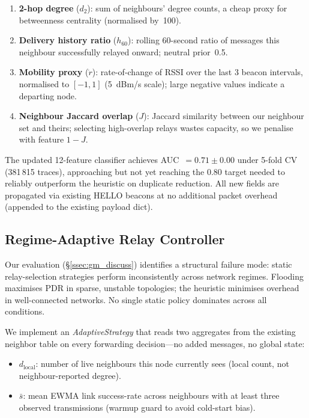 \documentclass[conference]{IEEEtran}
\begin{document}
\begin{enumerate}
  \item \textbf{2-hop degree} ($d_{2}$): sum of neighbours' degree counts, a
        cheap proxy for betweenness centrality (normalised by~100).
  \item \textbf{Delivery history ratio} ($h_{60}$): rolling 60-second ratio of
        messages this neighbour successfully relayed onward; neutral prior~0.5.
  \item \textbf{Mobility proxy} ($\dot{r}$): rate-of-change of RSSI over the
        last 3 beacon intervals, normalised to $[-1,1]$ (5~dBm/s scale);
        large negative values indicate a departing node.
  \item \textbf{Neighbour Jaccard overlap} ($J$): Jaccard similarity between
        our neighbour set and theirs; selecting high-overlap relays wastes
        capacity, so we penalise with feature $1-J$.
\end{enumerate}

The updated 12-feature classifier achieves AUC~$=0.71\pm0.00$ under 5-fold CV (381\,815 traces), approaching but not yet reaching the 0.80 target needed to reliably outperform the heuristic on duplicate reduction.
All new fields are propagated via existing HELLO beacons at no additional packet
overhead (appended to the existing payload dict).

\subsection{Regime-Adaptive Relay Controller}
\label{ssec:adaptive}
Our evaluation (§\ref{ssec:gm_discuss}) identifies a structural failure mode:
static relay-selection strategies perform inconsistently across network regimes.
Flooding maximises PDR in sparse, unstable topologies; the heuristic minimises
overhead in well-connected networks.  No single static policy dominates across
all conditions.

We implement an \emph{AdaptiveStrategy} that reads two aggregates from the
existing neighbor table on every forwarding decision---no added messages, no
global state:

\begin{itemize}
  \item $d_{\text{local}}$: number of live neighbours this node currently sees
        (local count, not neighbour-reported degree).
  \item $\bar{s}$: mean EWMA link success-rate across neighbours with at least
        three observed transmissions (warmup guard to avoid cold-start bias).
\end{itemize}
\end{document}

